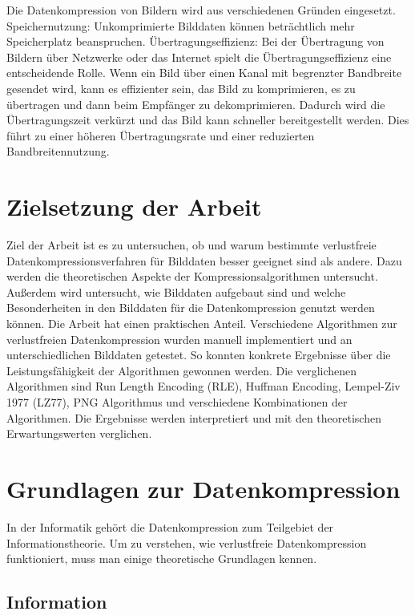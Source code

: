 \documentclass[conference]{IEEEtran}
\begin{document}
Die Datenkompression von Bildern wird aus verschiedenen Gründen eingesetzt.
Speichernutzung: Unkomprimierte Bilddaten können beträchtlich mehr Speicherplatz beanspruchen.
Übertragungseffizienz: Bei der Übertragung von Bildern über Netzwerke oder das Internet spielt
die Übertragungseffizienz eine entscheidende Rolle.
Wenn ein Bild über einen Kanal mit begrenzter Bandbreite gesendet wird, kann es effizienter
sein, das Bild zu komprimieren, es zu übertragen und dann beim Empfänger zu dekomprimieren.
Dadurch wird die Übertragungszeit verkürzt und das Bild kann schneller bereitgestellt werden.
Dies führt zu einer höheren Übertragungsrate und einer reduzierten Bandbreitennutzung.



\section{Zielsetzung der Arbeit}

Ziel der Arbeit ist es zu untersuchen, ob und warum bestimmte verlustfreie
Datenkompressionsverfahren für Bilddaten besser geeignet sind als andere.
Dazu werden die theoretischen Aspekte der Kompressionsalgorithmen untersucht.
Außerdem wird untersucht, wie Bilddaten aufgebaut sind und welche Besonderheiten
in den Bilddaten für die Datenkompression genutzt werden können.
Die Arbeit hat einen praktischen Anteil.
Verschiedene Algorithmen zur verlustfreien Datenkompression wurden manuell
implementiert und an unterschiedlichen Bilddaten getestet.
So konnten konkrete Ergebnisse über die Leistungsfähigkeit der Algorithmen gewonnen werden.
Die verglichenen Algorithmen sind Run Length Encoding (RLE), Huffman Encoding,
Lempel-Ziv 1977 (LZ77), PNG Algorithmus und verschiedene Kombinationen der Algorithmen.
Die Ergebnisse werden interpretiert und mit den theoretischen Erwartungswerten verglichen.

\section{Grundlagen zur Datenkompression}

In der Informatik gehört die Datenkompression zum Teilgebiet der Informationstheorie.
Um zu verstehen, wie verlustfreie Datenkompression funktioniert, muss man einige theoretische
Grundlagen kennen.

\subsection{Information}
\end{document}

